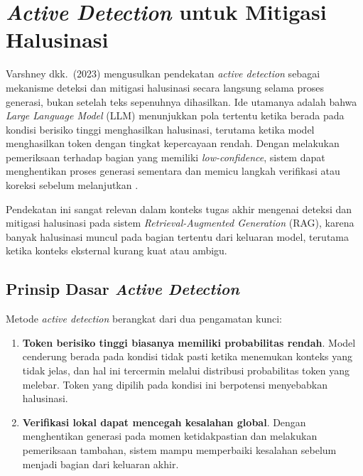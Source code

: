 
\section{\textit{Active Detection} untuk Mitigasi Halusinasi}
\label{sec:active-detection}

Varshney dkk.\ (2023) mengusulkan pendekatan \textit{active detection} sebagai mekanisme deteksi dan mitigasi halusinasi secara langsung selama proses generasi, bukan setelah teks sepenuhnya dihasilkan. Ide utamanya adalah bahwa \textit{Large Language Model} (LLM) menunjukkan pola tertentu ketika berada pada kondisi berisiko tinggi menghasilkan halusinasi, terutama ketika model menghasilkan token dengan tingkat kepercayaan rendah. Dengan melakukan pemeriksaan terhadap bagian yang memiliki \textit{low-confidence}, sistem dapat menghentikan proses generasi sementara dan memicu langkah verifikasi atau koreksi sebelum melanjutkan \parencite{varshney2023stitch}.

Pendekatan ini sangat relevan dalam konteks tugas akhir mengenai deteksi dan mitigasi halusinasi pada sistem \textit{Retrieval-Augmented Generation} (RAG), karena banyak halusinasi muncul pada bagian tertentu dari keluaran model, terutama ketika konteks eksternal kurang kuat atau ambigu.

\subsection{Prinsip Dasar \textit{Active Detection}}

Metode \textit{active detection} berangkat dari dua pengamatan kunci:

\begin{enumerate}[1.]
    \item \textbf{Token berisiko tinggi biasanya memiliki probabilitas rendah}.
    Model cenderung berada pada kondisi tidak pasti ketika menemukan konteks yang tidak jelas, dan hal ini tercermin melalui distribusi probabilitas token yang melebar. Token yang dipilih pada kondisi ini berpotensi menyebabkan halusinasi.

    \item \textbf{Verifikasi lokal dapat mencegah kesalahan global}.
    Dengan menghentikan generasi pada momen ketidakpastian dan melakukan pemeriksaan tambahan, sistem mampu memperbaiki kesalahan sebelum menjadi bagian dari keluaran akhir.
\end{enumerate}

